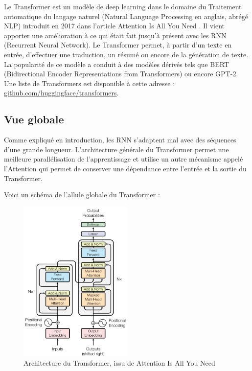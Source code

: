 Le \og Transformer \fg{} est un modèle de deep learning dans le domaine du Traitement automatique du langage naturel (Natural Language Processing en anglais, abrégé NLP)
introduit en 2017 dans l'article \og Attention Is All You Need \fg{}\cite{vaswani2017attention}. 
Il vient apporter une amélioration à ce qui était fait jusqu'à présent avec les RNN (Recurrent Neural Network). 
Le Transformer permet, à partir d'un texte en entrée, d'effectuer une traduction, un résumé ou encore de la génération de texte. \\

La popularité de ce modèle a conduit à des modèles dérivés tels que 
BERT (Bidirectional Encoder Representations from Transformers)\cite{devlin2018bert} ou encore GPT-2\cite{radford2019gpt2}.
Une liste de Transformers est disponible à cette adresse : \href{https://github.com/huggingface/transformers}{github.com/huggingface/transformers}.

\subsection{Vue globale}

Comme expliqué en introduction, les RNN s'adaptent mal avec des séquences d'une grande longueur. 
L'architecture générale du Transformer permet une meilleure parallélisation de l'apprentissage et utilise un autre mécanisme appelé \og l'Attention \fg{} qui permet
de conserver une dépendance entre l'entrée et la sortie du Transformer.

Voici un schéma de l'allule globale du Transformer :
\begin{figure}[h]
  \begin{center}
  \includegraphics[width=0.5\textwidth]{img/architecture_transformer.png}
  \end{center}
  \caption{Architecture du Transformer, issu de \og Attention Is All You Need \fg{}\cite{vaswani2017attention}}
  \label{fig:transformer}
\end{figure}

